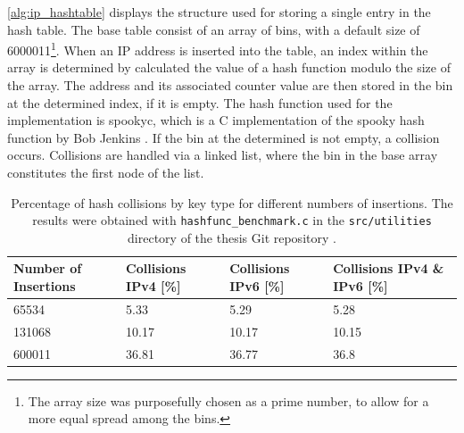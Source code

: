 \ref{alg:ip_hashtable} displays the structure used for storing a single entry in the hash table. The base
table consist of an array of bins, with a default size of 6000011\footnote{The array size was purposefully chosen as a prime number, to allow for a more equal spread among the bins.}.
When an \ac{IP} address is inserted into the table, an index within the array is determined by calculated the value of a hash function modulo 
the size of the array. The address and its associated counter value are then stored in the bin at the determined index, if it is empty. 
The hash function used for the implementation is spookyc, which is a C implementation of
the spooky hash function by Bob Jenkins \cite{spookyc}. If the bin at the determined is not empty, a collision occurs.
Collisions are handled via a linked list, where the bin in the base array constitutes the first node of the list.
\begin{table}[h!]
    \centering
    \small
    \begin{tabular}{llll}
        \toprule
        \textbf{Number of Insertions} & \textbf{Collisions IPv4 [\%]} & \textbf{Collisions IPv6 [\%]} & \textbf{Collisions IPv4 \& IPv6 [\%]}\\ \midrule 
        65534 & 5.33 & 5.29 & 5.28 \\ \midrule
        131068 & 10.17 & 10.17 & 10.15 \\ \midrule
        600011 & 36.81 & 36.77 & 36.8 \\
        \bottomrule
    \end{tabular}
    \caption[Hash Collisions]{Percentage of hash collisions by key type for different numbers of insertions. The results were obtained
    with \texttt{hashfunc\_benchmark.c} in the \texttt{src/utilities} directory of the thesis Git repository \cite{gitlab}.}
    \label{tab:hash_col}
\end{table}


